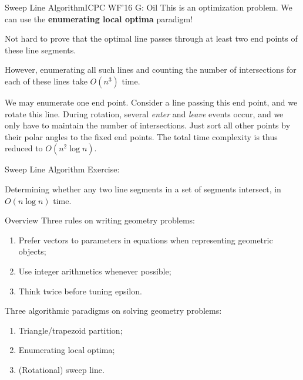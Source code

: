 \documentclass{beamer}
\begin{document}
\begin{frame}{Sweep Line Algorithm}{ICPC WF'16 G: Oil}
This is an optimization problem. We can use the \textbf{enumerating local optima} paradigm!

\pause

Not hard to prove that the optimal line passes through at least two end points of these line segments.

\pause

However, enumerating all such lines and counting the number of intersections for each of these lines take $O(n^3)$ time.

\pause

We may enumerate one end point. Consider a line passing this end point, and we rotate this line. During rotation, several \textit{enter} and \textit{leave} events occur, and we only have to maintain the number of intersections. Just sort all other points by their polar angles to the fixed end points. The total time complexity is thus reduced to $O(n^2 \log n)$.
\end{frame}


\begin{frame}{Sweep Line Algorithm}
Exercise: 

Determining whether any two line segments in a set of segments intersect, in $O(n \log n)$ time. 
\end{frame}

\begin{frame}{Overview}
Three rules on writing geometry problems:
\begin{enumerate}
	\item Prefer vectors to parameters in equations when representing geometric objects;
	\item Use integer arithmetics whenever possible;
	\item Think twice before tuning epsilon.
\end{enumerate}

Three algorithmic paradigms on solving geometry problems:
\begin{enumerate}
	\item Triangle/trapezoid partition;
	\item Enumerating local optima;
	\item (Rotational) sweep line.
\end{enumerate}
\end{frame}
\end{document}
